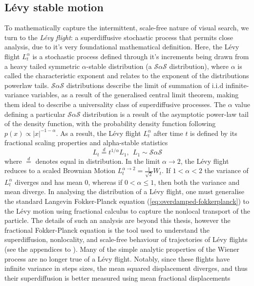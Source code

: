 \subsection{Lévy stable motion}\label{subsec:levy_motion}
To mathematically capture the intermittent, scale-free nature of visual search, we turn to the \textit{Lévy flight}: a superdiffusive stochastic process that permits close analysis, due to it's very foundational mathematical definition. Here, the Lévy flight $L_t^{\alpha}$ is a stochastic process defined through it's increments being drawn from a heavy tailed symmetric $\alpha$-stable distribution (a $\mathcal{S}\alpha\mathcal{S}$ distribution), where $\alpha$ is called the characteristic exponent and relates to the exponent of the distributions powerlaw tails. $\mathcal{S}\alpha\mathcal{S}$ distributions describe the limit of summation of i.i.d infinite-variance variables, as a result of the generalised central limit theorem, making them ideal to describe a universality class of superdiffusive processes. The $\alpha$ value defining a particular $\mathcal{S}\alpha\mathcal{S}$ distribution is a result of the asymptotic power-law tail of the density function, with the probability density function following $p(x) \propto |x|^{-1-\alpha}$. As a result, the Lévy flight $L_t^{\alpha}$ after time $t$ is defined by its fractional scaling properties and alpha-stable statistics
\begin{equation} \label{eq:levy_noise}
	L_t \stackrel{d}{=} t^{1/\alpha} L_1, \ \ L_1 \sim \mathcal{S}\alpha\mathcal{S}
\end{equation}
where $\stackrel{d}{=}$ denotes equal in distribution. In the limit $\alpha \rightarrow 2$, the Lévy flight reduces to a scaled Brownian Motion $L_t^{\alpha \rightarrow 2} = \frac{1}{\sqrt{2}}W_t$. If $1 < \alpha < 2$ the variance of $L_t^{\alpha}$ diverges and has mean 0, whereas if $0 < \alpha \leq 1$, then both the variance and mean diverge. In analysing the distribution of a Lévy flight, one must generalise the standard Langevin Fokker-Planck equation (\ref{eq:overdamped-fokkerplanck}) to the Lévy motion using fractional calculus to capture the nonlocal transport of the particle. The details of such an analysis are beyond this thesis, however the fractional Fokker-Planck equation is the tool used to understand the superdiffusion, nonlocality, and scale-free behaviour of trajectories of Lévy flights (see the appendices to \cite{qi_fractional_2022}). Many of the simple analytic properties of the Wiener process are no longer true of a Lévy flight. Notably, since these flights have infinite variance in steps sizes, the mean squared displacement diverges, and thus their superdiffusion is better measured using mean fractional displacements
